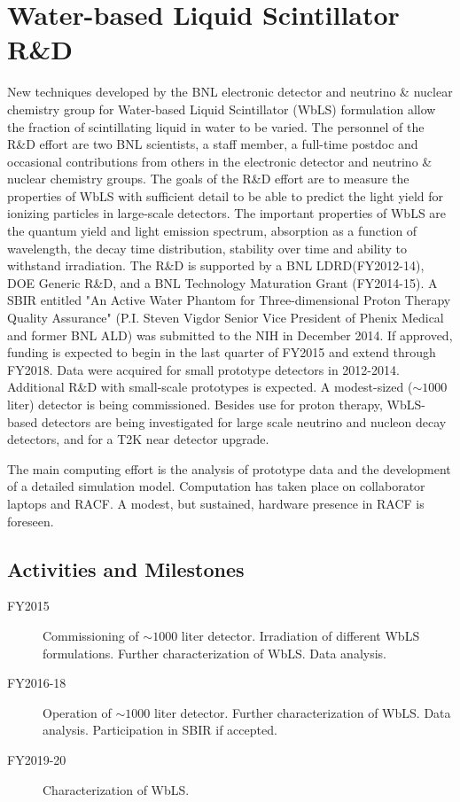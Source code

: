 \documentclass[pdftex,12pt,letter]{article}
\begin{document}
\pagebreak
\section{Water-based Liquid Scintillator R\&D}
New techniques developed by the BNL electronic detector and neutrino
\& nuclear chemistry group for Water-based Liquid Scintillator (WbLS)
formulation allow the fraction of scintillating liquid in water to be
varied. 
The personnel of the R\&D effort are two BNL scientists, a staff
member, a full-time postdoc and occasional contributions from others
in the electronic detector and neutrino \& nuclear chemistry groups.   
The goals of the R\&D effort are to measure the properties of WbLS
with sufficient detail to be able to predict the light yield for
ionizing particles in large-scale detectors. 
The important properties of WbLS are the quantum yield and light
emission spectrum, absorption as a function of wavelength, the decay
time distribution, stability over time and ability to withstand
irradiation.
The R\&D is supported by a BNL LDRD(FY2012-14), DOE Generic R\&D, and
a BNL Technology Maturation Grant (FY2014-15). A SBIR entitled "An
Active Water Phantom for Three-dimensional Proton Therapy Quality
Assurance" (P.I. Steven Vigdor Senior Vice President of Phenix Medical
and former BNL ALD) was submitted to the NIH in December 2014. If
approved, funding is expected to begin in the last quarter of FY2015
and extend through FY2018. Data were acquired for small prototype
detectors in 2012-2014. Additional R\&D with small-scale prototypes is
expected. 
A modest-sized ($\sim\!1000$ liter) detector is being commissioned. 
Besides use for proton therapy, WbLS-based detectors are being
investigated for large scale neutrino and nucleon decay detectors, and
for a T2K near detector upgrade.

The main computing effort is the analysis of prototype data and the development of a detailed
simulation model. Computation has taken place on collaborator laptops and RACF.  
A modest, but sustained, hardware presence in RACF is foreseen.


\subsection{Activities and Milestones}

\begin{description}
\item[FY2015] Commissioning of $\sim\!1000$ liter detector. 
				Irradiation of different WbLS formulations. 
                Further characterization of WbLS.
                Data analysis.
\item[FY2016-18] Operation of $\sim\!1000$ liter detector.
				Further characterization of WbLS.
                Data analysis.
                Participation in SBIR if accepted. 
                \item [FY2019-20] Characterization of WbLS. 
\end{description}
\end{document}
